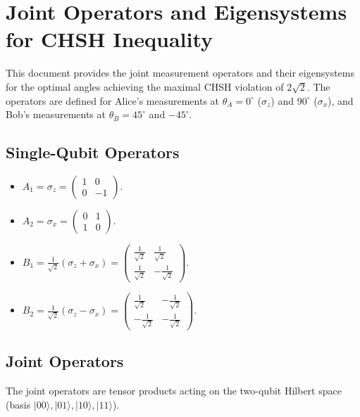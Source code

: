 \documentclass{article}
\begin{document}
\section*{Joint Operators and Eigensystems for CHSH Inequality}

This document provides the joint measurement operators and their eigensystems for the optimal angles achieving the maximal CHSH violation of \( 2\sqrt{2} \). The operators are defined for Alice's measurements at \( \theta_A = 0^\circ \) (\( \sigma_z \)) and \( 90^\circ \) (\( \sigma_x \)), and Bob's measurements at \( \theta_B = 45^\circ \) and \( -45^\circ \).

\subsection*{Single-Qubit Operators}
\begin{itemize}
    \item \( A_1 = \sigma_z = \begin{pmatrix} 1 & 0 \\ 0 & -1 \end{pmatrix} \).
    \item \( A_2 = \sigma_x = \begin{pmatrix} 0 & 1 \\ 1 & 0 \end{pmatrix} \).
    \item \( B_1 = \frac{1}{\sqrt{2}} (\sigma_z + \sigma_x) = \begin{pmatrix} \frac{1}{\sqrt{2}} & \frac{1}{\sqrt{2}} \\ \frac{1}{\sqrt{2}} & -\frac{1}{\sqrt{2}} \end{pmatrix} \).
    \item \( B_2 = \frac{1}{\sqrt{2}} (\sigma_z - \sigma_x) = \begin{pmatrix} \frac{1}{\sqrt{2}} & -\frac{1}{\sqrt{2}} \\ -\frac{1}{\sqrt{2}} & -\frac{1}{\sqrt{2}} \end{pmatrix} \).
\end{itemize}

\subsection*{Joint Operators}
The joint operators are tensor products acting on the two-qubit Hilbert space (basis \( |00\rangle, |01\rangle, |10\rangle, |11\rangle \)).
\end{document}
